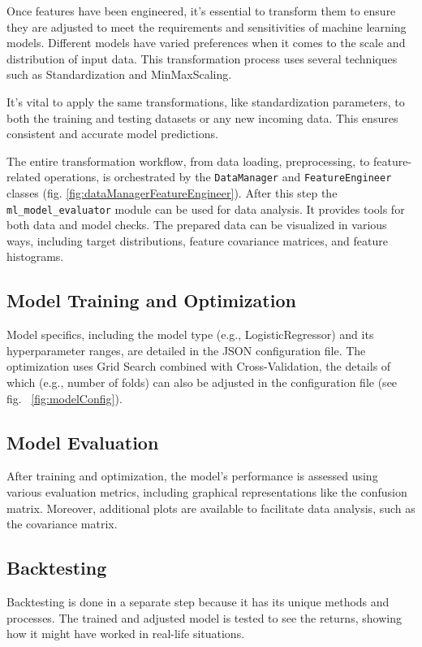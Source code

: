 Once features have been engineered, it's essential to transform them to ensure they are adjusted to meet the requirements and sensitivities of machine learning models. Different models have varied preferences when it comes to the scale and distribution of input data. This transformation process uses several techniques such as Standardization and MinMaxScaling.

It's vital to apply the same transformations, like standardization parameters, to both the training and testing datasets or any new incoming data. This ensures consistent and accurate model predictions.

The entire transformation workflow, from data loading, preprocessing, to feature-related operations, is orchestrated by the \texttt{DataManager} and \texttt{FeatureEngineer} classes (fig. \ref{fig:dataManagerFeatureEngineer}).
After this step the \texttt{ml\_model\_evaluator} module can be used for data analysis. It provides tools for both data and model checks. The prepared data can be visualized in various ways, including target distributions, feature covariance matrices, and feature histograms.


\subsection{Model Training and Optimization}
Model specifics, including the model type (e.g., LogisticRegressor) and its hyperparameter ranges, are detailed in the JSON configuration file. The optimization uses Grid Search combined with Cross-Validation, the details of which (e.g., number of folds) can also be adjusted in the configuration file (see fig. ~\ref{fig:modelConfig}).

\subsection{Model Evaluation}
After training and optimization, the model's performance is assessed using various evaluation metrics, including graphical representations like the confusion matrix. Moreover, additional plots are available to facilitate data analysis, such as the covariance matrix.

\subsection{Backtesting}
Backtesting is done in a separate step because it has its unique methods and processes. The trained and adjusted model is tested to see the returns, showing how it might have worked in real-life situations.
